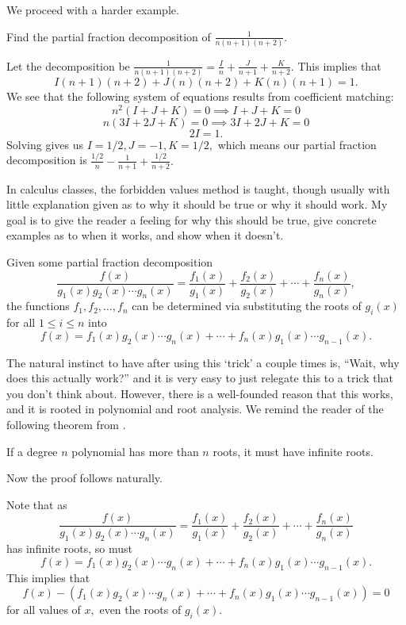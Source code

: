 \documentclass[blue,onecol]{shooting}
\begin{document}
We proceed with a harder example.

\begin{exam}
Find the partial fraction decomposition of $\frac{1}{n(n+1)(n+2)}.$
\end{exam}
\begin{sol}
Let the decomposition be $\frac{1}{n(n+1)(n+2)}=\frac{I}{n}+\frac{J}{n+1}+\frac{K}{n+2}.$ This implies that \[I(n+1)(n+2)+J(n)(n+2)+K(n)(n+1)=1.\]
We see that the following system of equations results from coefficient matching: $$n^2(I+J+K)=0\implies I+J+K=0$$ $$n(3I+2J+K)=0\implies 3I+2J+K=0$$ $$2I=1.$$ Solving gives us $I=1/2, J=-1, K=1/2,$ which means our partial fraction decomposition is $\frac{1/2}{n}-\frac{1}{n+1}+\frac{1/2}{n+2}.$
\end{sol}

In calculus classes, the forbidden values method is taught, though usually with little explanation given as to why it should be true or why it should work. My goal is to give the reader a feeling for why this should be true, give concrete examples as to when it works, and show when it doesn't.

\begin{theo}
Given some partial fraction decomposition
\[\frac{f(x)}{g_1(x)g_2(x)\cdots g_n(x)}=\frac{f_1(x)}{g_1(x)}+\frac{f_2(x)}{g_2(x)}+\cdots+\frac{f_n(x)}{g_n(x)},\]
the functions $f_1,f_2,\ldots, f_n$ can be determined via substituting the roots of $g_i(x)$ for all $1\leq i\leq n$ into
\[f(x)=f_1(x)g_2(x)\cdots g_n(x)+\cdots+f_n(x)g_1(x)\cdots g_{n-1}(x).\]
\end{theo}

The natural instinct to have after using this `trick' a couple times is, ``Wait, why does this actually work?'' and it is very easy to just relegate this to a trick that you don't think about. However, there is a well-founded reason that this works, and it is rooted in polynomial and root analysis. We remind the reader of the following theorem from .

\begin{theo}
If a degree $n$ polynomial has more than $n$ roots, it must have infinite roots.
\end{theo}

Now the proof follows naturally.

\begin{pro}
Note that as
\[\frac{f(x)}{g_1(x)g_2(x)\cdots g_n(x)}=\frac{f_1(x)}{g_1(x)}+\frac{f_2(x)}{g_2(x)}+\cdots+\frac{f_n(x)}{g_n(x)}\]
has infinite roots, so must 
\[f(x)=f_1(x)g_2(x)\cdots g_n(x)+\cdots+f_n(x)g_1(x)\cdots g_{n-1}(x).\]
This implies that
\[f(x)-(f_1(x)g_2(x)\cdots g_n(x)+\cdots+f_n(x)g_1(x)\cdots g_{n-1}(x))=0\]
for all values of $x,$ even the roots of $g_i(x).$
\end{pro}
\end{document}
